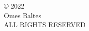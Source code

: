 \vspace*{\fill}

\begin{center}
© 2022\\
Omes Baltes\\
ALL RIGHTS RESERVED
\end{center}
\thispagestyle{empty}